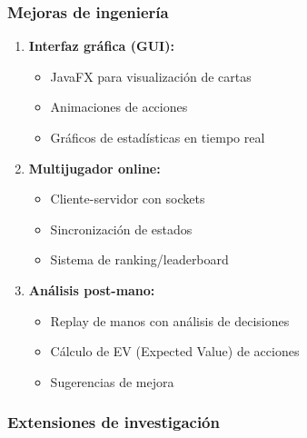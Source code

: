 \documentclass[12pt,a4paper]{article}
\begin{document}
\subsubsection{Mejoras de ingeniería}

\begin{enumerate}
    \item \textbf{Interfaz gráfica (GUI):}
    \begin{itemize}
        \item JavaFX para visualización de cartas
        \item Animaciones de acciones
        \item Gráficos de estadísticas en tiempo real
    \end{itemize}
    
    \item \textbf{Multijugador online:}
    \begin{itemize}
        \item Cliente-servidor con sockets
        \item Sincronización de estados
        \item Sistema de ranking/leaderboard
    \end{itemize}
    
    \item \textbf{Análisis post-mano:}
    \begin{itemize}
        \item Replay de manos con análisis de decisiones
        \item Cálculo de EV (Expected Value) de acciones
        \item Sugerencias de mejora
    \end{itemize}
\end{enumerate}

\subsubsection{Extensiones de investigación}
\end{document}
